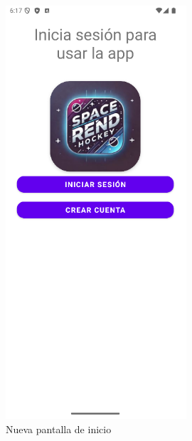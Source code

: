 \documentclass[a4paper,openright,12pt]{article}
\begin{document}
\begin{figure}[htp]
\begin{minipage}{0.3\textwidth}
        \includegraphics[width=0.6\textwidth]{Images/Vista_It4_1.png} 
        \caption{Nueva pantalla de inicio}
        \label{fig:Pantalla de inicio}
    \end{minipage}
    \hfill
    \begin{minipage}{0.3\textwidth}
        \centering

\end{minipage}
\end{figure}
\end{document}
